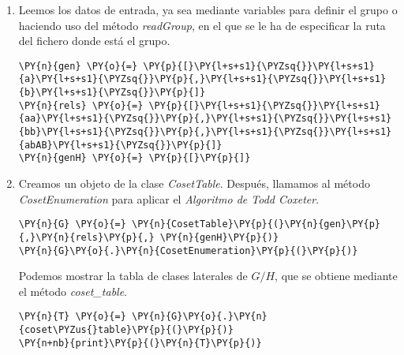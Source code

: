 \begin{enumerate}
\item Leemos los datos de entrada, ya sea mediante variables para definir el grupo o
  haciendo uso del método \textit{readGroup}, en el que se le ha de especificar la ruta del fichero donde está el grupo.
  
  \begin{tcolorbox}[breakable, size=fbox, boxrule=1pt, pad at break*=1mm,colback=cellbackground, colframe=cellborder]
\begin{Verbatim}[commandchars=\\\{\}]
\PY{n}{gen} \PY{o}{=} \PY{p}{[}\PY{l+s+s1}{\PYZsq{}}\PY{l+s+s1}{a}\PY{l+s+s1}{\PYZsq{}}\PY{p}{,}\PY{l+s+s1}{\PYZsq{}}\PY{l+s+s1}{b}\PY{l+s+s1}{\PYZsq{}}\PY{p}{]}
\PY{n}{rels} \PY{o}{=} \PY{p}{[}\PY{l+s+s1}{\PYZsq{}}\PY{l+s+s1}{aa}\PY{l+s+s1}{\PYZsq{}}\PY{p}{,}\PY{l+s+s1}{\PYZsq{}}\PY{l+s+s1}{bb}\PY{l+s+s1}{\PYZsq{}}\PY{p}{,}\PY{l+s+s1}{\PYZsq{}}\PY{l+s+s1}{abAB}\PY{l+s+s1}{\PYZsq{}}\PY{p}{]}
\PY{n}{genH} \PY{o}{=} \PY{p}{[}\PY{p}{]}
\end{Verbatim}
\end{tcolorbox}
  
  
  
\item Creamos un objeto de la clase \textit{CosetTable}. Después, llamamos al método \textit{CosetEnumeration} para aplicar el \textit{Algoritmo de Todd Coxeter}.

\begin{tcolorbox}[breakable, size=fbox, boxrule=1pt, pad at break*=1mm,colback=cellbackground, colframe=cellborder]
\begin{Verbatim}[commandchars=\\\{\}]
\PY{n}{G} \PY{o}{=} \PY{n}{CosetTable}\PY{p}{(}\PY{n}{gen}\PY{p}{,}\PY{n}{rels}\PY{p}{,} \PY{n}{genH}\PY{p}{)}
\PY{n}{G}\PY{o}{.}\PY{n}{CosetEnumeration}\PY{p}{(}\PY{p}{)}
\end{Verbatim}
\end{tcolorbox}


  
Podemos mostrar la tabla de clases laterales de $G/H$, que se obtiene mediante el método \textit{coset\_table}.

    \begin{tcolorbox}[breakable, size=fbox, boxrule=1pt, pad at break*=1mm,colback=cellbackground, colframe=cellborder]
\begin{Verbatim}[commandchars=\\\{\}]
\PY{n}{T} \PY{o}{=} \PY{n}{G}\PY{o}{.}\PY{n}{coset\PYZus{}table}\PY{p}{(}\PY{p}{)}
\PY{n+nb}{print}\PY{p}{(}\PY{n}{T}\PY{p}{)}
\end{Verbatim}
\end{tcolorbox}


\end{enumerate}
